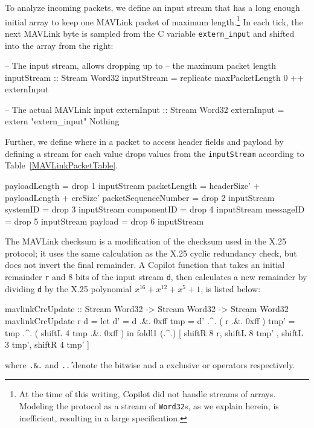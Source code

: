 To analyze incoming packets, we define an input stream that has a long enough
initial array to keep one MAVLink packet of maximum length.\footnote{At the time
  of this writing, Copilot did not handle streams of arrays.  Modeling the
  protocol as a stream of {\tt Word32}s, as we explain herein, is inefficient,
  resulting in a large specification.} In each tick, the next MAVLink byte is
sampled from the C variable {\tt extern\_input} and shifted into the array from
the right:

\begin{code}
-- The input stream, allows dropping up to
-- the maximum packet length
inputStream :: Stream Word32
inputStream = replicate maxPacketLength 0 ++ externInput

-- The actual MAVLink input
externInput :: Stream Word32
externInput = extern "extern_input" Nothing
\end{code}


Further, we define where in a packet to access header fields and payload by
defining a stream for each value drops values from the {\tt inputStream}
according to Table~\ref{MAVLinkPacketTable}.

\begin{code}
payloadLength         = drop 1 inputStream
packetLength          = headerSize' + payloadLength
                                    + crcSize'
packetSequenceNumber  = drop 2 inputStream
systemID              = drop 3 inputStream
componentID           = drop 4 inputStream
messageID             = drop 5 inputStream
payload               = drop 6 inputStream
\end{code}


The MAVLink checksum is a modification of the checksum used in the X.25
protocol; it uses the same calculation as the X.25 cyclic redundancy check, but
does not invert the final remainder. A Copilot function that takes an initial
remainder {\tt r} and 8 bits of the input stream {\tt d}, then calculates a new
remainder by dividing {\tt d} by the X.25 polynomial $x^{16} + x^{12} + x^5 +
1$, is listed below:

\begin{code}
mavlinkCrcUpdate :: Stream Word32 -> Stream Word32
                                  -> Stream Word32
mavlinkCrcUpdate r d =
let d'   = d   .&. 0xff
    tmp  = d'  .^. ( r .&. 0xff )
    tmp' = tmp .^. ( shiftL 4 tmp .&. 0xff )
in foldl1 (.^.) [ shiftR 8 r,    shiftL 8 tmp'
                , shiftL 3 tmp', shiftR 4 tmp' ]
\end{code}
where \texttt{.\&.} and \texttt{.\^.} denote the bitwise and a exclusive or
operators respectively.

